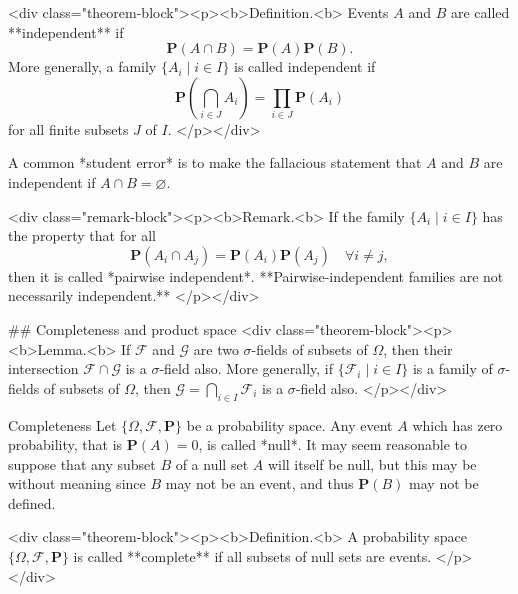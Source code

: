<div class="theorem-block"><p><b>Definition.<b> 
Events $A$ and $B$ are called **independent** if 
$$\begin{equation}
    \mathbf{P}(A \cap B) = \mathbf{P}(A) \mathbf{P}(B).
\end{equation}$$
More generally, a family $\{A_i \;\vert\; i \in I\}$ is called independent if
$$\begin{equation}
    \mathbf{P} \left( \bigcap_{i \in J} A_i \right) = \prod_{i\in J} \mathbf{P}(A_i)
\end{equation}$$
for all finite subsets $J$ of $I$. 
</p></div>

\begin{caution}
A common *student error* is to make the fallacious statement that $A$ and $B$ are independent if $A \cap B = \varnothing$.
\end{caution}

<div class="remark-block"><p><b>Remark.<b> 
If the family $\{A_i \;\vert\; i \in I\}$ has the property that 
for all 
$$\begin{equation}
    \mathbf{P}(A_i \cap A_j) = \mathbf{P}(A_i) \mathbf{P}(A_j) \quad \forall i\neq j, 
\end{equation}$$
then it is called *pairwise independent*. **Pairwise-independent families are not necessarily independent.** 
</p></div>

## Completeness and product space
<div class="theorem-block"><p><b>Lemma.<b> 
If $\mathcal{F}$ and $\mathcal{G}$ are two $\sigma$-fields of subsets of $\Omega$, then their intersection $\mathcal{F} \cap \mathcal{G}$ is a $\sigma$-field also. More generally, if $\{ \mathcal{F}_i \;\vert\;  i \in I \}$ is a family of $\sigma$-fields of subsets of $\Omega$, then $\mathcal{G} = \bigcap_{i\in I} \mathcal{F}_i $ is a $\sigma$-field also. 
</p></div>

\begin{newnotion}{Completeness}
Let $\{\Omega, \mathcal{F}, \mathbf{P}\}$ be a probability space. Any event $A$ which has zero probability, that is $\mathbf{P}(A) = 0$, is called *null*. It may seem reasonable to suppose that any subset $B$ of a null set $A$ will itself be null, but this may be without meaning since $B$ may not be an event, and thus $\mathbf{P}(B)$ may not be defined. 
\end{newnotion}

<div class="theorem-block"><p><b>Definition.<b> 
A probability space $\{\Omega, \mathcal{F}, \mathbf{P}\}$ is called **complete** if all subsets of null sets are events. 
</p></div>

